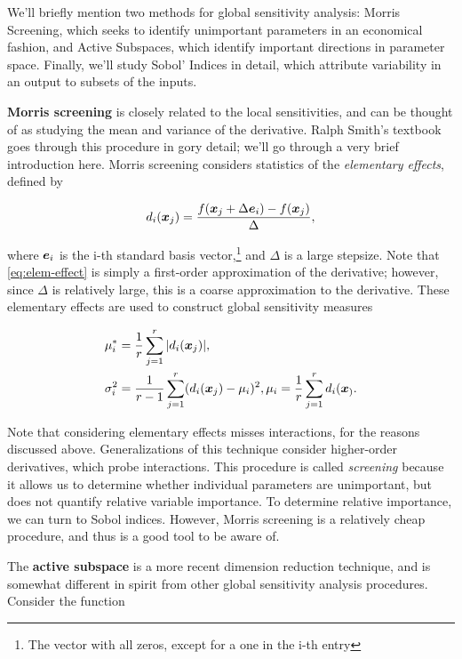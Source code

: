 \documentclass[../primer.tex]{subfiles}
\begin{document}
We'll briefly mention two methods for global sensitivity analysis: Morris
Screening, which seeks to identify unimportant parameters in an economical
fashion, and Active Subspaces, which identify important directions in parameter
space. Finally, we'll study Sobol' Indices in detail, which attribute
variability in an output to subsets of the inputs.

\textbf{Morris screening} is closely related to the local sensitivities, and can
be thought of as studying the mean and variance of the derivative. Ralph Smith's
textbook \cite{smith2013uncertainty} goes through this procedure in gory detail;
we'll go through a very brief introduction here. Morris screening considers
statistics of the \emph{elementary effects}, defined by

\begin{equation}\label{eq:elem-effect}
  d_{i}(\boldsymbol{x}_j) = \frac{f(\boldsymbol{x}_j+\Delta \boldsymbol{e}_i) - f(\boldsymbol{x}_j)}{\Delta},
\end{equation}

\noindent where $\boldsymbol{e}_i$ is the i-th standard basis vector,\footnote{The vector
  with all zeros, except for a one in the i-th entry} and $\Delta$ is a large
stepsize. Note that \eqref{eq:elem-effect} is simply a first-order approximation
of the derivative; however, since $\Delta$ is relatively large, this is a coarse
approximation to the derivative. These elementary effects are used to construct
global sensitivity measures

\begin{equation}\begin{aligned}
  \mu_i^* &= \frac{1}{r}\sum_{j=1}^r |d_{i}(\boldsymbol{x}_j)|, \\
  \sigma_i^2 &= \frac{1}{r-1}\sum_{j=1}^r(d_{i}(\boldsymbol{x}_j)-\mu_i)^2, \mu_i=\frac{1}{r}\sum_{j=1}^rd_{i}(\boldsymbol{x}_).
\end{aligned}\end{equation}

Note that considering elementary effects misses interactions, for the reasons
discussed above. Generalizations of this technique consider higher-order
derivatives, which probe interactions. This procedure is called \emph{screening}
because it allows us to determine whether individual parameters are unimportant,
but does not quantify relative variable importance. To determine relative
importance, we can turn to Sobol indices. However, Morris screening is a
relatively cheap procedure, and thus is a good tool to be aware of.

The \textbf{active subspace} is a more recent dimension reduction technique, and
is somewhat different in spirit from other global sensitivity analysis
procedures.\cite{constantine2015} Consider the function
\end{document}
